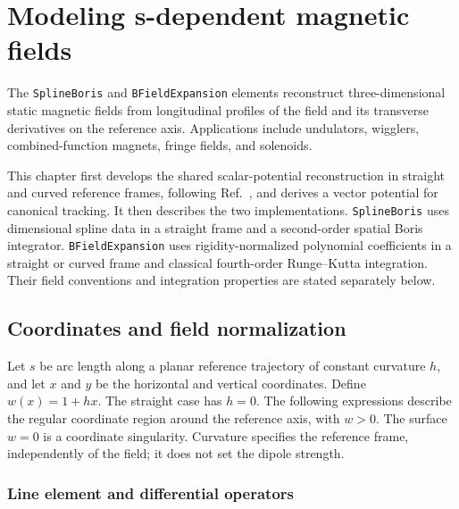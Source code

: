 \chapter{Modeling s-dependent magnetic fields}
\label{chapter:s-dependent-magnetic-fields}

The \texttt{SplineBoris} and \texttt{BFieldExpansion} elements reconstruct
three-dimensional static magnetic fields from longitudinal profiles of the
field and its transverse derivatives on the reference axis. Applications
include undulators, wigglers, combined-function magnets, fringe fields,
and solenoids.

This chapter first develops the shared scalar-potential reconstruction in
straight and curved reference frames, following
Ref.~\cite{VanDerSchueren2024}, and derives a vector potential for canonical
tracking. It then describes the two implementations. \texttt{SplineBoris}
uses dimensional spline data in a straight frame and a second-order spatial
Boris integrator. \texttt{BFieldExpansion} uses rigidity-normalized polynomial
coefficients in a straight or curved frame and classical fourth-order
Runge--Kutta integration. Their field conventions and integration properties
are stated separately below.

\section{Coordinates and field normalization}

Let \(s\) be arc length along a planar reference trajectory of constant
curvature \(h\), and let \(x\) and \(y\) be the horizontal and vertical
coordinates. Define \(w(x)=1+hx\).
The straight case has \(h=0\). The following expressions describe the
regular coordinate region around the reference axis, with \(w>0\).
The surface \(w=0\) is a coordinate singularity. Curvature specifies the
reference frame, independently of the field; it does not set the dipole
strength.

\subsection{Line element and differential operators}

